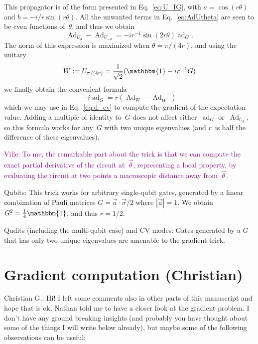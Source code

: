 \documentclass[aps,pra,10pt,twocolumn,groupedaddress,nofootinbib]{revtex4-1}
\theoremstyle{plain}
\DeclareMathOperator{\Ad}{Ad}
\DeclareMathOperator{\ad}{ad}
\newcommand{\be}{\begin{equation}}
\newcommand{\ee}{\end{equation}}
\newcommand{\I}{\mathbbm{1}} %
\newcommand{\ville}[1]{\textcolor{purple}{Ville: #1}}
\newcommand{\cg}[1]{\textcolor{cyan!80!black}{Christian G.: #1}}
\begin{document}


This propagator is of the form presented in Eq.~\eqref{eq:U_IG},
with $a=\cos(r\theta)$ and $b=-i/r \sin(r\theta)$.
All the unwanted terms in Eq.~\eqref{eq:AdUtheta} are seen to be even functions of~$\theta$,
and thus we obtain
\be
\Ad_{U_\theta} -\Ad_{U_{-\theta}}
=
-i r^{-1} \sin(2r\theta) \ad_G.
\ee
The norm of this expression is maximized when $\theta = \pi/(4r)$,
and using the unitary
\be
W := U_{\pi/(4r)} = \frac{1}{\sqrt{2}}(\I -ir^{-1}G)
\ee
we finally obtain the convenient formula
\be
\label{eq:adAdformula}
-i\ad_G = r(\Ad_W-\Ad_{W^\dagger})
\ee
which we may use in Eq.~\eqref{eq:d_ev} to compute the gradient of the expectation value.
Adding a multiple of identity to~$G$ does not affect either~$\ad_G$ or~$\Ad_{U_{\theta}}$,
so this formula works for any~$G$ with two unique eigenvalues (and $r$~is half the difference of these eigenvalues).

\ville{To me, the remarkable part about the trick is that we can compute the exact partial derivative of the circuit at~$\vec{\theta}$,
  representing a local property, by evaluating the circuit at two points a macroscopic distance away from~$\vec{\theta}$.}


Qubits:
This trick works for arbitrary single-qubit gates, generated by a linear combination of Pauli matrices
$G = \vec{a} \cdot \vec{\sigma}/2$
where $|\vec{a}|=1$.
We obtain $G^2 = \frac{1}{4} \I$, and thus $r=1/2$.

Qudits (including the multi-qubit case) and CV modes:
Gates generated by a $G$ that has only two unique eigenvalues are amenable to the gradient trick.



\section{Gradient computation (Christian)}
\cg{Hi! I left some comments also in other parts of this manuscript and hope that is ok. Nathan told me to have a closer look at the gradient problem. I don't have any ground breaking insights (and probably you have thought about some of the things I will write below already), but maybe some of the following observations can be useful:}
\end{document}
